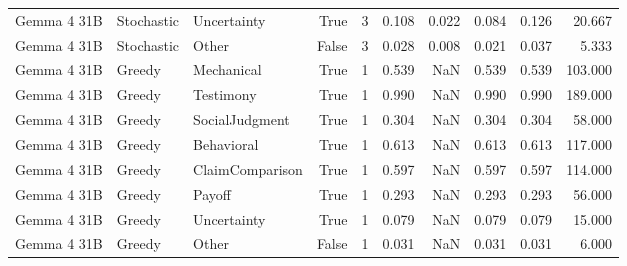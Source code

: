 \begin{tabular}{lllrrrrrrr}
Gemma 4 31B & Stochastic & Uncertainty & True & 3 & 0.108 & 0.022 & 0.084 & 0.126 & 20.667 \\
Gemma 4 31B & Stochastic & Other & False & 3 & 0.028 & 0.008 & 0.021 & 0.037 & 5.333 \\
Gemma 4 31B & Greedy & Mechanical & True & 1 & 0.539 & NaN & 0.539 & 0.539 & 103.000 \\
Gemma 4 31B & Greedy & Testimony & True & 1 & 0.990 & NaN & 0.990 & 0.990 & 189.000 \\
Gemma 4 31B & Greedy & SocialJudgment & True & 1 & 0.304 & NaN & 0.304 & 0.304 & 58.000 \\
Gemma 4 31B & Greedy & Behavioral & True & 1 & 0.613 & NaN & 0.613 & 0.613 & 117.000 \\
Gemma 4 31B & Greedy & ClaimComparison & True & 1 & 0.597 & NaN & 0.597 & 0.597 & 114.000 \\
Gemma 4 31B & Greedy & Payoff & True & 1 & 0.293 & NaN & 0.293 & 0.293 & 56.000 \\
Gemma 4 31B & Greedy & Uncertainty & True & 1 & 0.079 & NaN & 0.079 & 0.079 & 15.000 \\
Gemma 4 31B & Greedy & Other & False & 1 & 0.031 & NaN & 0.031 & 0.031 & 6.000 \\
\bottomrule
\end{tabular}
